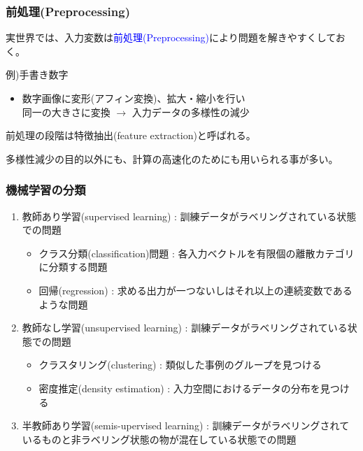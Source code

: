 \documentclass[dvipdfmx]{beamer}
\theoremstyle{definition}
\begin{document}
\begin{frame}
  \frametitle{前処理(Preprocessing)}
  実世界では、入力変数は\textcolor{blue}{前処理(Preprocessing)}により問題を解きやすくしておく。
  \begin{block}{例)手書き数字}
    \begin{itemize}
      \item 数字画像に変形(アフィン変換)、拡大・縮小を行い \\ 同一の大きさに変換 $\to$ 入力データの多様性の減少
    \end{itemize}
  \end{block}
  前処理の段階は特徴抽出(feature extraction)と呼ばれる。
  
  多様性減少の目的以外にも、計算の高速化のためにも用いられる事が多い。
\end{frame}

\begin{frame}
  \frametitle{機械学習の分類}
  \begin{enumerate}
    \item 教師あり学習(supervised learning) : 訓練データがラベリングされている状態での問題
      \begin{itemize}
        \item クラス分類(classification)問題 : 各入力ベクトルを有限個の離散カテゴリに分類する問題
        \item 回帰(regression) : 求める出力が一つないしはそれ以上の連続変数であるような問題
      \end{itemize}
    \item 教師なし学習(unsupervised learning) : 訓練データがラベリングされている状態での問題
      \begin{itemize}
        \item クラスタリング(clustering) : 類似した事例のグループを見つける
        \item 密度推定(density estimation) : 入力空間におけるデータの分布を見つける
      \end{itemize}
    \item 半教師あり学習(semis-upervised learning) : 訓練データがラベリングされているものと非ラベリング状態の物が混在している状態での問題
  \end{enumerate}
\end{frame}
\end{document}
